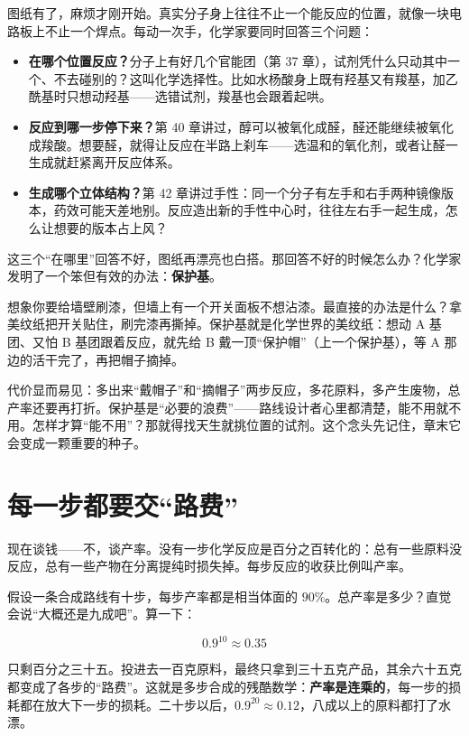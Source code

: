 图纸有了，麻烦才刚开始。真实分子身上往往不止一个能反应的位置，就像一块电路板上不止一个焊点。每动一次手，化学家要同时回答三个问题：

\begin{itemize}[itemsep=2pt]
\item \textbf{在哪个位置反应？}分子上有好几个官能团（第 37 章），试剂凭什么只动其中一个、不去碰别的？这叫化学选择性。比如水杨酸身上既有羟基又有羧基，加乙酰基时只想动羟基——选错试剂，羧基也会跟着起哄。
\item \textbf{反应到哪一步停下来？}第 40 章讲过，醇可以被氧化成醛，醛还能继续被氧化成羧酸。想要醛，就得让反应在半路上刹车——选温和的氧化剂，或者让醛一生成就赶紧离开反应体系。
\item \textbf{生成哪个立体结构？}第 42 章讲过手性：同一个分子有左手和右手两种镜像版本，药效可能天差地别。反应造出新的手性中心时，往往左右手一起生成，怎么让想要的版本占上风？
\end{itemize}

这三个“在哪里”回答不好，图纸再漂亮也白搭。那回答不好的时候怎么办？化学家发明了一个笨但有效的办法：\textbf{保护基}。

想象你要给墙壁刷漆，但墙上有一个开关面板不想沾漆。最直接的办法是什么？拿美纹纸把开关贴住，刷完漆再撕掉。保护基就是化学世界的美纹纸：想动 A 基团、又怕 B 基团跟着反应，就先给 B 戴一顶“保护帽”（上一个保护基），等 A 那边的活干完了，再把帽子摘掉。

代价显而易见：多出来“戴帽子”和“摘帽子”两步反应，多花原料，多产生废物，总产率还要再打折。保护基是“必要的浪费”——路线设计者心里都清楚，能不用就不用。怎样才算“能不用”？那就得找天生就挑位置的试剂。这个念头先记住，章末它会变成一颗重要的种子。

\section{每一步都要交“路费”}

现在谈钱——不，谈产率。没有一步化学反应是百分之百转化的：总有一些原料没反应，总有一些产物在分离提纯时损失掉。每步反应的收获比例叫产率。

假设一条合成路线有十步，每步产率都是相当体面的 $90\%$。总产率是多少？直觉会说“大概还是九成吧”。算一下：

\[0.9^{10}\approx 0.35\]

只剩百分之三十五。投进去一百克原料，最终只拿到三十五克产品，其余六十五克都变成了各步的“路费”。这就是多步合成的残酷数学：\textbf{产率是连乘的}，每一步的损耗都在放大下一步的损耗。二十步以后，$0.9^{20}\approx 0.12$，八成以上的原料都打了水漂。

